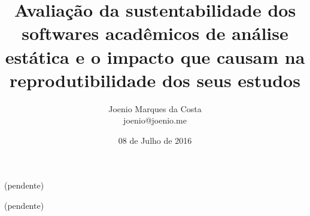 \documentclass[msc, classic, a4paper]{ufbathesis}
\date{08 de Julho de 2016}
\title{
  Avaliação da sustentabilidade dos softwares acadêmicos de análise estática e
  o impacto que causam na reprodutibilidade dos seus estudos
}
\author{Joenio Marques da Costa\\
  {\small joenio@joenio.me}
}
\begin{document}
\frontpage
\frontmatter
\presentationpage

\resumo

(pendente)

\begin{keywords}

  (pendente)

\end{keywords}

\tableofcontents
\listoffigures
\listoftables

\mainmatter










\backmatter


\appendix



\end{document}
